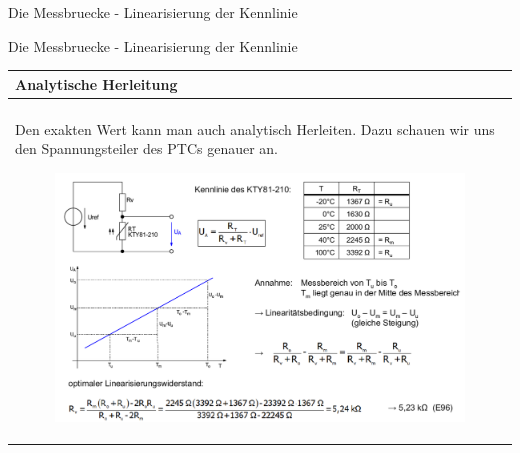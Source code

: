 \begin{frame}[t]{Die Messbruecke - Linearisierung der Kennlinie}
\begin{spacing}{0.9}
\begin{tiny}
\begin{table}[h!]
    \end{table}
     
    \end{tiny} \end{spacing}

\end{frame}

\begin{frame}[t]{Die Messbruecke - Linearisierung der Kennlinie} 
    
    \begin{spacing}{0.9} \begin{tiny}
      \begin{table}[h!]
      \begin{tabular}{p{10cm} }
        \hline
        \textbf{Analytische Herleitung} \\
        \hline \\
        \begin{minipage}{\textwidth}
            Den exakten Wert kann man auch analytisch Herleiten. Dazu schauen wir uns den Spannungsteiler des PTCs genauer an.
        \end{minipage}
        \begin{minipage}{\textwidth}
            \begin{figure}
                \centering    
                \includegraphics[width=0.9\linewidth]{pictures/linearisierung.png}
            \end{figure}
        \end{minipage}  
       \\        
    \end{tabular}

    \end{table}
     
    \end{tiny} \end{spacing}

\end{frame}
